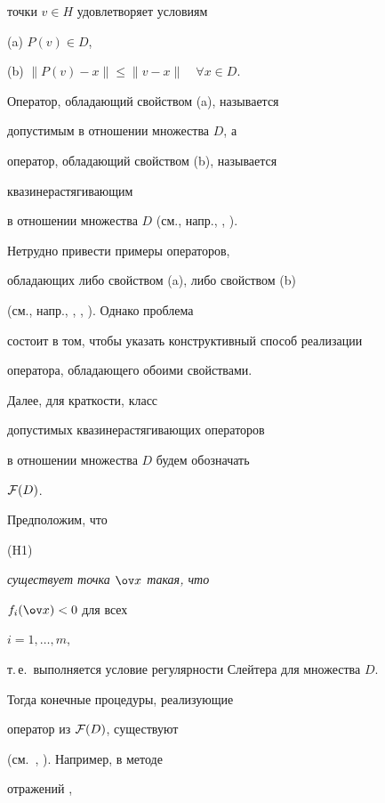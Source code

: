 точки $ v\in H$ удовлетворяет условиям





(a) $ P(v) \in D $,





(b) $ \| P(v) - x \| \leq \| v - x \| \quad \forall x\in D$.





Оператор, обладающий свойством (a), называется


допустимым в отношении множества $D$, а


оператор, обладающий свойством (b), называется


квазинерастягивающим


в отношении множества $D$ (см., напр., \cite{VA93}, \cite{Kon97}).


Нетрудно привести примеры операторов,


обладающих либо свойством (a), либо свойством (b)


(см., напр., \cite{VA93}, \cite{Zoi63}, \cite{Kar86}). Однако проблема


состоит в том, чтобы указать конструктивный способ реализации


оператора, обладающего обоими свойствами.


 Далее, для краткости, класс


допустимых квазинерастягивающих операторов


в отношении множества $D$ будем обозначать


$ {\cal F}(D)$.





 Предположим, что





 (H1) {\it существует точка $\ov x$ такая, что


$f_{i}(\ov x) < 0$ для всех} $i=1,\dotsc,m$, \newline


т.\,е.~выполняется условие регулярности Слейтера для множества $D$.





 Тогда конечные процедуры, реализующие


оператор из ${\cal F}(D)$, существуют


(см.~\cite{KF84}, \cite{KF87}). Например, в методе


отражений \cite{KF84},


